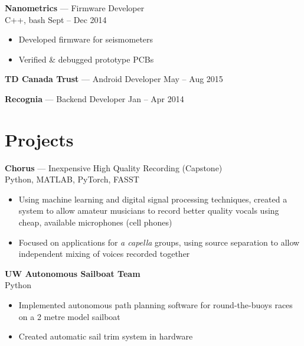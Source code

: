 \documentclass[letterpaper,10pt]{article}
\newcommand{\comment}[1]{}
\begin{document}
\begin{minipage}[t]{0.6\textwidth}
{\large
\textbf{Nanometrics} --- Firmware Developer\\
}
{\footnotesize
C++, bash \hfill Sept -- Dec 2014
}
\begin{itemize}
    \item {Developed firmware for seismometers}
    \item {Verified \& debugged prototype PCBs}
\end{itemize}
\bigskip

{\large
\textbf{TD Canada Trust} --- Android Developer \hfill {\footnotesize May -- Aug 2015}\\
}
\comment{
{\footnotesize
Java (Android), PostgreSQL \hfill May -- Aug 2015\\
}
\begin{itemize}
    \item{Prototyped Android apps to explore new technologies applied to banking (e.g. internet of things)}
\end{itemize}
}

{\large
\textbf{Recognia} --- Backend Developer \hfill {\footnotesize Jan -- Apr 2014}\\
}
\comment{
{\footnotesize
Java, Perl, PostgreSQL, AngularJS \hfill Jan  -- Apr 2014\\
}
\begin{itemize}
    \item{Built backend and API for website for technical analysis of financial instruments}
    \item{Created new caching strategy, reducing cache misses by 60\%}
\end{itemize}
}

\section{Projects}
\smallskip
{\large
\textbf{Chorus} --- Inexpensive High Quality Recording (Capstone) \\
}
{\footnotesize
Python, MATLAB, PyTorch, FASST
}
\begin{itemize}
	\item {Using machine learning and digital signal processing techniques, created a system to allow amateur musicians to record better quality vocals using cheap, available microphones (cell phones)}
    \item {Focused on applications for \textit{a capella} groups, using source separation to allow independent mixing of voices recorded together}
\end{itemize}

\bigskip

{\large
\textbf{UW Autonomous Sailboat Team}\\
}
{\footnotesize
Python
}
\begin{itemize}
	\item {Implemented autonomous path planning software for round-the-buoys races on a 2 metre model sailboat}
    \item {Created automatic sail trim system in hardware}
\end{itemize}


\end{minipage}
\end{document}
